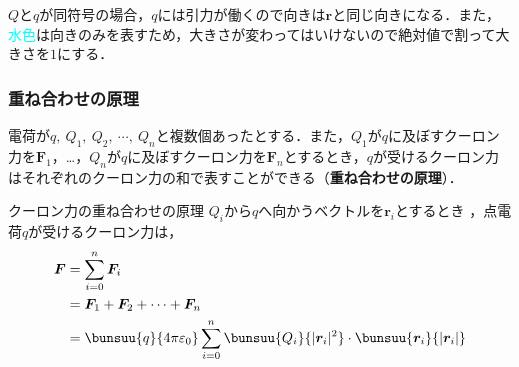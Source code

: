 $Q$と$q$が同符号の場合，$q$には引力が働くので向きは$\bm{r}$と同じ向きになる．また，\textcolor{cyan}{水色}は向きのみを表すため，大きさが変わってはいけないので絶対値で割って大きさを$1$にする．



\subsubsection*{重ね合わせの原理}

電荷が$q,\ Q_1,\ Q_2,\ \cdots,\ Q_n$と複数個あったとする．また，$Q_1$が$q$に及ぼすクーロン力を$\bm{F}_1$，…，$Q_n$が$q$に及ぼすクーロン力を$\bm{F}_n$とするとき，$q$が受けるクーロン力はそれぞれのクーロン力の和で表すことができる（\textbf{重ね合わせの原理}）．

\begin{kousiki}{クーロン力の重ね合わせの原理}
	$Q_i$から$q$へ向かうベクトルを$\bm{r}_i$とするとき
	，点電荷$q$が受けるクーロン力は，
	\begin{align}
		\bm{F} &= \sum_{i = 0}^{n} \bm{F}_i\\
			&= \bm{F}_1 + \bm{F}_2 + \cdots + \bm{F}_n \notag\\
			&= \bunsuu{q}{4\pi\varepsilon_0} \sum_{i = 0}^{n} \bunsuu{Q_i}{|\bm{r}_i|^2} \cdot \bunsuu{\bm{r}_i}{|\bm{r}_i|}
	\end{align}
\end{kousiki}

